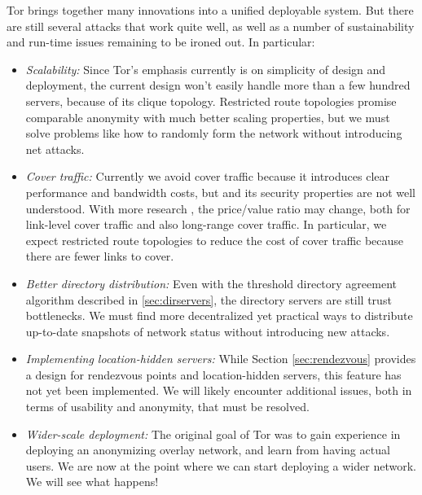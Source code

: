 \documentclass[times,10pt,twocolumn]{article}
\begin{document}

\label{sec:conclusion}

Tor brings together many innovations into
a unified deployable system. But there are still several attacks that
work quite well, as well as a number of sustainability and run-time
issues remaining to be ironed out. In particular:

\begin{itemize}
\item \emph{Scalability:} Since Tor's emphasis currently is on simplicity
of design and deployment, the current design won't easily handle more
than a few hundred servers, because of its clique topology. Restricted
route topologies \cite{danezis-pets03} promise comparable anonymity
with much better scaling properties, but we must solve problems like
how to randomly form the network without introducing net attacks.
\item \emph{Cover traffic:} Currently we avoid cover traffic because
it introduces clear performance and bandwidth costs, but and its
security properties are not well understood. With more research
\cite{SS03,defensive-dropping}, the price/value ratio may change, both for
link-level cover traffic and also long-range cover traffic. In particular,
we expect restricted route topologies to reduce the cost of cover traffic
because there are fewer links to cover.
\item \emph{Better directory distribution:} Even with the threshold
directory agreement algorithm described in \ref{sec:dirservers},
the directory servers are still trust bottlenecks. We must find more
decentralized yet practical ways to distribute up-to-date snapshots of
network status without introducing new attacks.
\item \emph{Implementing location-hidden servers:} While Section
\ref{sec:rendezvous} provides a design for rendezvous points and
location-hidden servers, this feature has not yet been implemented.
We will likely encounter additional issues, both in terms of usability
and anonymity, that must be resolved.
\item \emph{Wider-scale deployment:} The original goal of Tor was to
gain experience in deploying an anonymizing overlay network, and learn
from having actual users. We are now at the point where we can start
deploying a wider network. We will see what happens!
\end{itemize}






\end{document}
